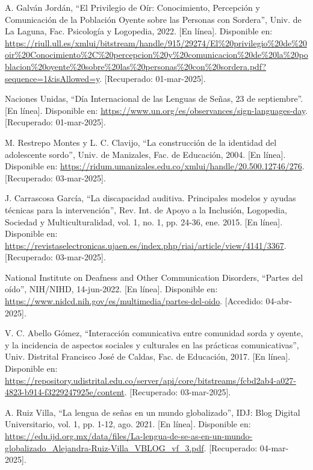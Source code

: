 \begin{thebibliography}{200}
    A. Galván Jordán, “El Privilegio de Oír: Conocimiento, Percepción y Comunicación de la Población Oyente sobre las Personas con Sordera”, Univ. de La Laguna, Fac. Psicología y Logopedia, 2022. [En línea]. Disponible en: \url{https://riull.ull.es/xmlui/bitstream/handle/915/29274/El%20privilegio%20de%20oir%20Conocimiento%2C%20percepcion%20y%20comunicacion%20de%20la%20poblacion%20oyente%20sobre%20las%20personas%20con%20sordera.pdf?sequence=1&isAllowed=y}. [Recuperado: 01-mar-2025].

    Naciones Unidas, “Día Internacional de las Lenguas de Señas, 23 de septiembre”. [En línea]. Disponible en: \url{https://www.un.org/es/observances/sign-languages-day}. [Recuperado: 01-mar-2025].

    M. Restrepo Montes y L. C. Clavijo, “La construcción de la identidad del adolescente sordo”, Univ. de Manizales, Fac. de Educación, 2004. [En línea]. Disponible en: \url{https://ridum.umanizales.edu.co/xmlui/handle/20.500.12746/276}. [Recuperado: 03-mar-2025].

    J. Carrascosa García, “La discapacidad auditiva. Principales modelos y ayudas técnicas para la intervención”, Rev. Int. de Apoyo a la Inclusión, Logopedia, Sociedad y Multiculturalidad, vol. 1, no. 1, pp. 24-36, ene. 2015. [En línea]. Disponible en: \url{https://revistaselectronicas.ujaen.es/index.php/riai/article/view/4141/3367}. [Recuperado: 03-mar-2025].

    National Institute on Deafness and Other Communication Disorders, “Partes del oído”, NIH/NIHD, 14-jun-2022. [En línea]. Disponible en: \url{https://www.nidcd.nih.gov/es/multimedia/partes-del-oido}. [Accedido: 04-abr-2025]. 

    V. C. Abello Gómez, “Interacción comunicativa entre comunidad sorda y oyente, y la incidencia de aspectos sociales y culturales en las prácticas comunicativas”, Univ. Distrital Francisco José de Caldas, Fac. de Educación, 2017. [En línea]. Disponible en: \url{https://repository.udistrital.edu.co/server/api/core/bitstreams/fcbd2ab4-a027-4823-b914-f3229247925e/content}. [Recuperado: 03-mar-2025].

    A. Ruiz Villa, “La lengua de señas en un mundo globalizado”, IDJ: Blog Digital Universitario, vol. 1, pp. 1-12, ago. 2021. [En línea]. Disponible en: \url{https://edu.ijd.org.mx/data/files/La-lengua-de-se-as-en-un-mundo-globalizado_Alejandra-Ruiz-Villa_VBLOG_vf_3.pdf}. [Recuperado: 04-mar-2025].


\end{thebibliography}
